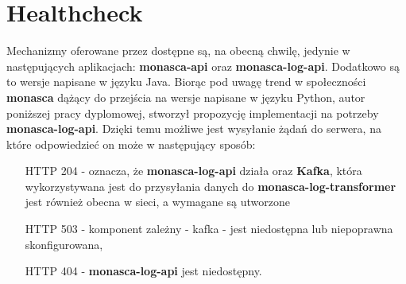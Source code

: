 
\section{Healthcheck}
\label{chapter:application_own:plans:healthcheck}

Mechanizmy oferowane przez  dostępne są, na obecną chwilę, jedynie
w następujących aplikacjach: \textbf{monasca-api} oraz \textbf{monasca-log-api}. Dodatkowo są to wersje napisane w języku
Java. Biorąc pod uwagę trend w społeczności \textbf{monasca} dążący do przejścia na wersje napisane w języku Python,
autor poniższej pracy dyplomowej, stworzył propozycję implementacji na potrzeby \textbf{monasca-log-api}. Dzięki
temu możliwe jest wysyłanie żądań do serwera, na które odpowiedzieć on może w następujący sposób:
\begin{itemize}
    \item[HTTP 204] - oznacza, że \textbf{monasca-log-api} działa oraz \textbf{Kafka}, która wykorzystywana jest
    do przysyłania danych do \textbf{monasca-log-transformer} jest również obecna w sieci, a wymagane  są
    utworzone
    \item[HTTP 503] - komponent zależny - kafka - jest niedostępna lub niepoprawna skonfigurowana,
    \item[HTTP 404] - \textbf{monasca-log-api} jest niedostępny.
\end{itemize}

